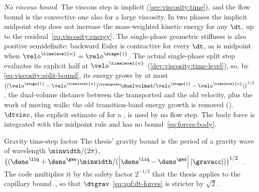 \emph{No viscous bound.} The viscous step is implicit
(\cref{sec:viscosity:time}), and the flow bound is the convective one also
for a large viscosity. In two phases the implicit midpoint step does not
increase the mass-weighted kinetic energy for any $\dt$, up to the
residual~\cref{eq:viscosity:energy}. The single-phase geometric stiffness is
also positive semidefinite: backward Euler is contractive for every $\dt$,
as is midpoint when $\velo^{\timelevel{n}}=\velo^{\stage{1}}$. The actual
single-phase split step evaluates its explicit half at
$\velo^{\timelevel{n}}$ (\cref{dev:viscosity:time-level}), so, by
\cref{eq:viscosity:split-bound}, its energy grows by at most
$\big((\velo^{\stage{1}}-\velo^{\timelevel{n}})^{\transpose}\dualvolmat(\velo^{\stage{1}}-\velo^{\timelevel{n}})\big)^{1/2}$,
the dual-volume distance between the transported and the old velocity, plus
the work of moving walls; the old transition-band energy growth is removed
(). $\dtvisc$, the explicit
estimate of  for a
, is used by no flow step. The body force
is integrated with the midpoint rule and has no bound~\cref{eq:forces:body}.

\begin{deviation}{Gravity time-step factor}\label{dev:stab:gravity}
The thesis' gravity bound is the period of a gravity wave of wavelength
$\minwidth/(2\pi)$, $\big((\dens^{\liq}+\dens^{\gas})\minwidth/(\abs{\dens^{\liq}-\dens^{\gas}}\abs{\gravacc})\big)^{1/2}$~.
The code multiplies it by the safety factor $2^{-1/2}$ that the thesis
applies to the capillary bound~, so that
$\dtgrav$~\cref{eq:vof:dt-forces} is stricter by $\sqrt2$.
\end{deviation}

